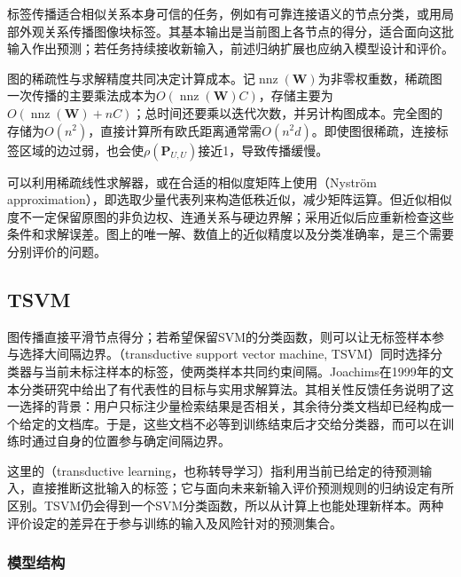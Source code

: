 标签传播适合相似关系本身可信的任务，例如有可靠连接语义的节点分类，或用局部外观关系传播图像块标签。其基本输出是当前图上各节点的得分，适合面向这批输入作出预测；若任务持续接收新输入，前述归纳扩展也应纳入模型设计和评价。

图的稀疏性与求解精度共同决定计算成本。记$\operatorname{nnz}(\bm{W})$为非零权重数，稀疏图一次传播的主要乘法成本为$O(\operatorname{nnz}(\bm{W})C)$，存储主要为$O(\operatorname{nnz}(\bm{W})+nC)$；总时间还要乘以迭代次数，并另计构图成本。完全图的存储为$O(n^2)$，直接计算所有欧氏距离通常需$O(n^2d)$。即使图很稀疏，连接标签区域的边过弱，也会使$\rho(\bm{P}_{U,U})$接近1，导致传播缓慢。

可以利用稀疏线性求解器，或在合适的相似度矩阵上使用（Nyström approximation），即选取少量代表列来构造低秩近似，减少矩阵运算。但近似相似度不一定保留原图的非负边权、连通关系与硬边界解；采用近似后应重新检查这些条件和求解误差。图上的唯一解、数值上的近似精度以及分类准确率，是三个需要分别评价的问题。

\subsection{TSVM}
\label{sec:classification-tsvm}

图传播直接平滑节点得分；若希望保留SVM的分类函数，则可以让无标签样本参与选择大间隔边界。（transductive support vector machine, TSVM）同时选择分类器与当前未标注样本的标签，使两类样本共同约束间隔。Joachims在1999年的文本分类研究中给出了有代表性的目标与实用求解算法。其相关性反馈任务说明了这一选择的背景：用户只标注少量检索结果是否相关，其余待分类文档却已经构成一个给定的文档库。于是，这些文档不必等到训练结束后才交给分类器，而可以在训练时通过自身的位置参与确定间隔边界。

这里的（transductive learning，也称转导学习）指利用当前已给定的待预测输入，直接推断这批输入的标签；它与面向未来新输入评价预测规则的归纳设定有所区别。TSVM仍会得到一个SVM分类函数，所以从计算上也能处理新样本。两种评价设定的差异在于参与训练的输入及风险针对的预测集合。

\subsubsection{模型结构}
\label{sec:classification-tsvm-structure}

